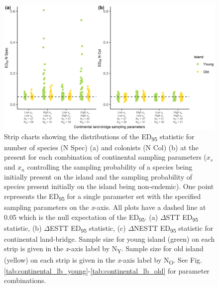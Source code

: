 \begin{figure}
    \centering
    \includegraphics{continental_land_bridge_sample_spec_col_facet_.png}
    \caption{Strip charts showing the distributions of the ED\textsubscript{95} statistic for number of species (N Spec) (a) and colonists (N Col) (b) at the present for each combination of continental sampling parameters ($x_s$ and $x_n$ controlling the sampling probability of a species being initially present on the island and the sampling probability of species present initially on the island being non-endemic). One point represents the ED\textsubscript{95} for a single parameter set with the specified sampling parameters on the \textit{x}-axis. All plots have a dashed line at 0.05 which is the null expectation of the ED\textsubscript{95}. (a) $\Delta$STT ED\textsubscript{95} statistic, (b) $\Delta$ESTT ED\textsubscript{95} statistic, (c) $\Delta$NESTT ED\textsubscript{95} statistic for continental land-bridge. Sample size for young island (green) on each strip is given in the \textit{x}-axis label by N\textsubscript{Y}. Sample size for old island (yellow) on each strip is given in the \textit{x}-axis label by N\textsubscript{O}. See Fig. \ref{tab:continental_lb_young}-\ref{tab:continental_lb_old} for parameter combinations.}
    \label{fig:continental_land_bridge_sample_spec_col_facet_}
\end{figure}

